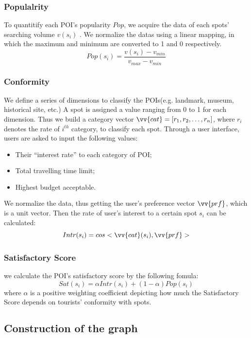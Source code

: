 \documentclass{mcmthesis}
\begin{document}
\subsubsection{Populalrity}
  
  To quantitify each POI's popularity $Pop$, we acquire the data of each spots' searching volume $v(s_i)$ . We normalize the datas using a linear mapping, in which the maximum and minimum are converted to 1 and 0 respectively. 
  \[
  	Pop(s_i) = \frac{v(s_i) - v_{min}}{v_{max} - v_{min}}
  \]

\subsubsection{Conformity}

  We define a series of dimensions to classify the POIs(e.g. landmark, museum, historical site, etc.) A spot is assigned a value ranging from 0 to 1 for each dimension. Thus we build a category vector $\vv{cat} = [r_{1}, r_{2}, \ldots, r_{n}]$, where $r_{i}$ denotes the rate of $i^{th}$ category, to classify each spot. Through a user interface, users are asked to input the following values:
  \begin{itemize}
    \item Their ``interest rate'' to each category of POI;
    \item Total travelling time limit;
    \item Highest budget acceptable.
  \end{itemize}
  
  We normalize the data, thus getting the user's preference vector $\vv{prf}$, which is a unit vector. Then the rate of user's interest to a certain spot $s_i$ can be calculated: 
  \[
    Intr(s_i) = cos<\vv{cat}(s_i),\vv{prf}>
  \]

\subsubsection{Satisfactory Score}
  
  we calculate the POI's satisfactory score by the following fomula:
  \[
    Sat(s_i) = \alpha Intr(s_i) + (1-\alpha)Pop(s_i)
  \]
  where $\alpha$ is a positive weighting coefficient depicting how much the Satisfactory Score depends on tourists' conformity with spots.

\subsection{Construction of the graph}
\end{document}
